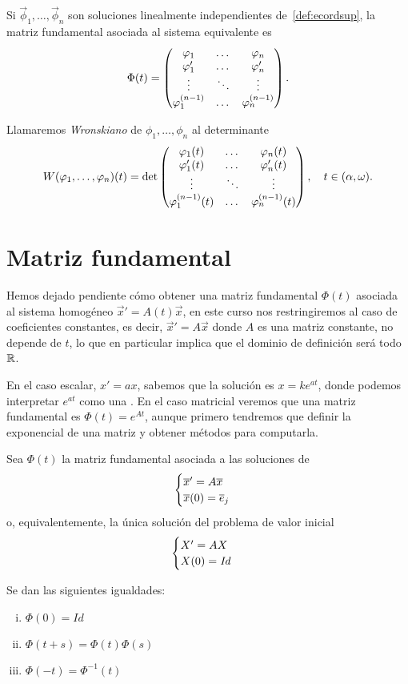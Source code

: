 \documentclass[../ecuaciones_diferenciales.tex]{subfiles}
\begin{document}
Si \(\vec{\phi}_1, \dots, \vec{\phi}_n\) son soluciones linealmente 
independientes de~\ref{def:ecordsup}, la matriz fundamental asociada al 
sistema equivalente es
\[\Phi(t) = \begin{pmatrix}
		\varphi_1 & \dots & \varphi_n \\
		\varphi'_1 & \dots & \varphi'_n \\
		\vdots & \ddots & \vdots \\
		\varphi^{(n - 1)}_1 & \dots & \varphi^{(n - 1)}_n\end{pmatrix}.\]

\begin{definition}[Wronskiano]
	Llamaremos \emph{Wronskiano} de \(\phi_1, \dots, \phi_n\) al determinante
	\[W(\varphi_1, \dots, \varphi_n)(t) = \det\begin{pmatrix}
			\varphi_1(t) & \dots & \varphi_n(t) \\
			\varphi'_1(t) & \dots & \varphi'_n(t) \\
			\vdots & \ddots & \vdots \\
			\varphi^{(n - 1)}_1(t) & \dots & \varphi^{(n - 1)}_n(t) \\
		\end{pmatrix}, \quad t \in (\alpha, \omega).\]
\end{definition}

\section{Matriz fundamental}

Hemos dejado pendiente cómo obtener una matriz fundamental \(\Phi(t)\) asociada
al sistema homogéneo \(\vec{x}' = A(t)\vec{x}\), en este curso nos
restringiremos al caso de coeficientes constantes, es decir,
\(\vec{x}' = A\vec{x}\) donde \(A\) es una matriz constante, no depende de
\(t\), lo que en particular implica que el dominio de definición será todo
\(\mathbb{R}\).

En el caso escalar, \(x' = ax\), sabemos que la solución es \(x = ke^{at}\),
donde podemos interpretar \(e^{at}\) como una 
. 
En el caso matricial veremos que una matriz fundamental es
\(\Phi(t) = e^{At}\), aunque primero tendremos que definir la exponencial de una
matriz y obtener métodos para computarla.

\begin{lemma}
	\label{lem:expphi}
	Sea \(\Phi(t)\) la matriz fundamental asociada a las soluciones de
	\[\begin{cases}
		\overline{x}' = A\overline{x} \\
		\overline{x}(0) = \overline{e}_j\end{cases}\]
	o, equivalentemente, la única solución del problema de valor inicial
	\[\begin{cases}
			X' = AX \\
			X(0) = \mathit{Id}\end{cases}\]

	Se dan las siguientes igualdades:
	\begin{multicols}{3}
		\begin{enumerate}[i)]
			\item \(\displaystyle \Phi(0) = \mathit{Id}\)

			\item \(\displaystyle \Phi(t + s) = \Phi(t) \Phi(s)\)

			\item \(\displaystyle \Phi(-t) = \Phi^{-1}(t)\)
		\end{enumerate}
	\end{multicols}
\end{lemma}
\end{document}
